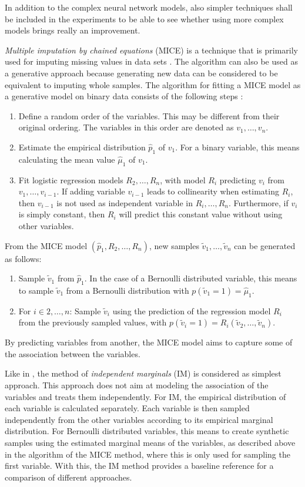 \documentclass[12pt]{article}
\begin{document}
In addition to the complex neural network models, also simpler techniques shall be included in the experiments to be able to see whether using more complex models brings really an improvement.

{\em Multiple imputation by chained equations} (MICE) is a technique that is primarily used for imputing missing values in data sets \citep{mice}.
The algorithm can also be used as a generative approach because generating new data can be considered to be equivalent to imputing whole samples.
The algorithm for fitting a MICE model as a generative model on binary data consists of the following steps \citep{goncalves, dsdbm}:
\begin{enumerate}
\item Define a random order of the variables. This may be different from their original ordering. The variables in this order are denoted as $v_1, \dots, v_n$. 
\item Estimate the empirical distribution $\hat{p}_1$ of $v_1$. For a binary variable, this means calculating the mean value $\hat{\mu}_1$ of $v_1$.
\item Fit logistic regression models $R_2, \dots, R_n$, with model $R_i$ predicting $v_i$ from  $v_1, \dots, v_{i-1}$. If adding variable $v_{i-1}$ leads to collinearity when estimating $R_i$, then $v_{i-1}$ is not used as independent variable in $R_{i}, \dots, R_n$. Furthermore, if $v_i$ is simply constant, then $R_i$ will predict this constant value without using other variables.
\end{enumerate}

From the MICE model $(\hat{p}_1, R_2, \dots, R_n)$, new samples $\tilde{v}_1, \dots , \tilde{v}_n$ can be generated as follows:

\begin{enumerate}
\item Sample $\tilde{v}_1$ from $\hat{p}_1$.
In the case of a Bernoulli distributed variable, this means to sample $\tilde{v}_1$ from a Bernoulli distribution with $p(\tilde{v}_1 = 1) = \hat{\mu}_1$.
\item For  $i \in 2, \dots, n$: Sample $\tilde{v}_i$ using the prediction of the regression model $R_i$ from the previously sampled values, with $p(\tilde{v}_i = 1) = R_i(\tilde{v}_2, \dots, \tilde{v}_n)$.
\end{enumerate}

By predicting variables from another, the MICE model aims to capture some of the association between the variables.

Like in \cite{goncalves}, the method of {\em independent marginals} (IM) is considered as simplest approach.
This approach does not aim at modeling the association of the variables and treats them independently.
For IM, the empirical distribution of each variable is calculated separately.
Each variable is then sampled independently from the other variables according to its empirical marginal distribution.
For Bernoulli distributed variables, this means to create synthetic samples using the estimated marginal means of the variables, as described above in the algorithm of the MICE method, where this is only used for sampling the first variable.
With this, the IM method provides a baseline reference for a comparison of different approaches.
\end{document}
